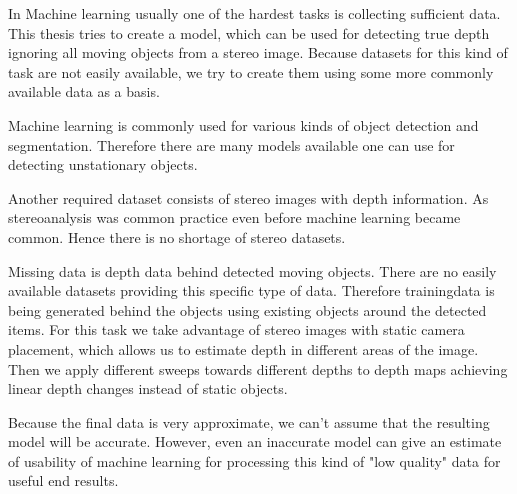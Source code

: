 In Machine learning usually one of the hardest tasks is collecting sufficient data.
This thesis tries to create a model, which can be used for detecting true depth ignoring all moving objects from a stereo image.
Because datasets for this kind of task are not easily available, we try to create them using some more commonly available data as a basis.

Machine learning is commonly used for various kinds of object detection and segmentation.
Therefore there are many models available one can use for detecting unstationary objects.

Another required dataset consists of stereo images with depth information.
As stereoanalysis was common practice even before machine learning became common.
Hence there is no shortage of stereo datasets.

Missing data is depth data behind detected moving objects.
There are no easily available datasets providing this specific type of data.
Therefore trainingdata is being generated behind the objects using existing objects around the detected items.
For this task we take advantage of stereo images with static camera placement, which allows us to estimate depth in different areas of the image.
Then we apply different sweeps towards different depths to depth maps achieving linear depth changes instead of static objects.

Because the final data is very approximate, we can’t assume that the resulting model will be accurate.
However, even an inaccurate model can give an estimate of usability of machine learning for processing this kind of "low quality" data for useful end results.

